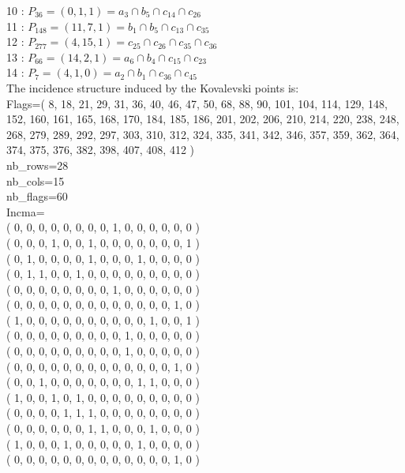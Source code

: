 \documentclass{article}
\begin{document}
{10 : $P_{36}=( 0, 1, 1 ) = a_{3} \cap b_{5} \cap c_{14} \cap c_{26}$\\
11 : $P_{148}=( 11, 7, 1 ) = b_{1} \cap b_{5} \cap c_{13} \cap c_{35}$\\
12 : $P_{277}=( 4, 15, 1 ) = c_{25} \cap c_{26} \cap c_{35} \cap c_{36}$\\
13 : $P_{66}=( 14, 2, 1 ) = a_{6} \cap b_{4} \cap c_{15} \cap c_{23}$\\
14 : $P_{7}=( 4, 1, 0 ) = a_{2} \cap b_{1} \cap c_{36} \cap c_{45}$\\
The incidence structure induced by the Kovalevski points is: 
\\
Flags=( 8, 18, 21, 29, 31, 36, 40, 46, 47, 50, 68, 88, 90, 101, 104, 114, 129, 148, 152, 160, 161, 165, 168, 170, 184, 185, 186, 201, 202, 206, 210, 214, 220, 238, 248, 268, 279, 289, 292, 297, 303, 310, 312, 324, 335, 341, 342, 346, 357, 359, 362, 364, 374, 375, 376, 382, 398, 407, 408, 412 )\\
nb\_rows=28\\
nb\_cols=15\\
nb\_flags=60\\
Incma=\\
( 0, 0, 0, 0, 0, 0, 0, 0, 1, 0, 0, 0, 0, 0, 0 )\\
( 0, 0, 0, 1, 0, 0, 1, 0, 0, 0, 0, 0, 0, 0, 1 )\\
( 0, 1, 0, 0, 0, 0, 1, 0, 0, 0, 1, 0, 0, 0, 0 )\\
( 0, 1, 1, 0, 0, 1, 0, 0, 0, 0, 0, 0, 0, 0, 0 )\\
( 0, 0, 0, 0, 0, 0, 0, 0, 1, 0, 0, 0, 0, 0, 0 )\\
( 0, 0, 0, 0, 0, 0, 0, 0, 0, 0, 0, 0, 0, 1, 0 )\\
( 1, 0, 0, 0, 0, 0, 0, 0, 0, 0, 0, 1, 0, 0, 1 )\\
( 0, 0, 0, 0, 0, 0, 0, 0, 0, 1, 0, 0, 0, 0, 0 )\\
( 0, 0, 0, 0, 0, 0, 0, 0, 0, 1, 0, 0, 0, 0, 0 )\\
( 0, 0, 0, 0, 0, 0, 0, 0, 0, 0, 0, 0, 0, 1, 0 )\\
( 0, 0, 1, 0, 0, 0, 0, 0, 0, 0, 1, 1, 0, 0, 0 )\\
( 1, 0, 0, 1, 0, 1, 0, 0, 0, 0, 0, 0, 0, 0, 0 )\\
( 0, 0, 0, 0, 1, 1, 1, 0, 0, 0, 0, 0, 0, 0, 0 )\\
( 0, 0, 0, 0, 0, 0, 1, 1, 0, 0, 0, 1, 0, 0, 0 )\\
( 1, 0, 0, 0, 1, 0, 0, 0, 0, 0, 1, 0, 0, 0, 0 )\\
( 0, 0, 0, 0, 0, 0, 0, 0, 0, 0, 0, 0, 0, 1, 0 )\\
}
\end{document}
